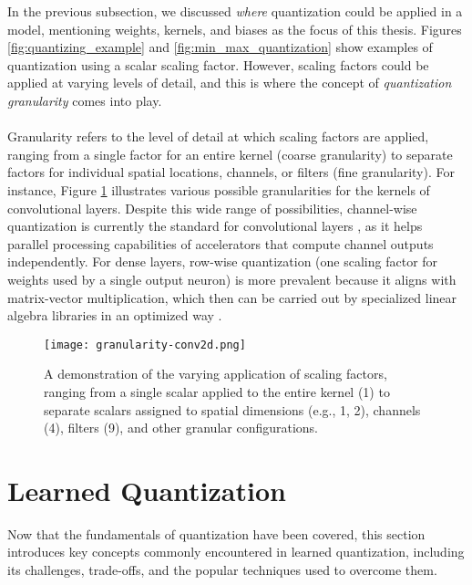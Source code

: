 \noindent In the previous subsection, we discussed \textit{where} quantization could be applied in a model, 
mentioning weights, kernels, and biases as the focus of this thesis.
Figures \ref{fig:quantizing_example} and \ref{fig:min_max_quantization} show examples of quantization
using a scalar scaling factor. However, scaling factors could be applied at varying levels of detail,
and this is where the concept of \textit{quantization granularity} comes into play.
\\
\\
Granularity refers to the level of detail at which scaling factors are applied,
ranging from a single factor for an entire kernel (coarse granularity) to separate factors for individual spatial locations,
channels, or filters (fine granularity). For instance, Figure \ref{fig:granularity-conv2d} illustrates various possible granularities
for the kernels of convolutional layers.
Despite this wide range of possibilities, channel-wise quantization is currently the standard for convolutional layers \cite{gholami2021survey},
as it helps parallel processing capabilities of accelerators that compute channel outputs independently. 
For dense layers, row-wise quantization (one scaling factor for weights used by a single output neuron) is more prevalent
because it aligns with matrix-vector multiplication, which then can be carried out by specialized linear algebra libraries
in an optimized way \cite{DBLP:journals/corr/abs-2101-05615}.

\begin{figure}[h!]
  \centering
  \texttt{[image: granularity-conv2d.png]}
  \caption{A demonstration of the varying application of scaling factors, ranging from a single scalar applied to the entire kernel (1) to separate scalars assigned to spatial dimensions (e.g., 1, 2), channels (4), filters (9), and other granular configurations.}
  \label{fig:granularity-conv2d}
\end{figure}



\section{Learned Quantization}
\label{sec:section3}
Now that the fundamentals of quantization have been covered, 
this section introduces key concepts commonly encountered in learned quantization,
including its challenges, trade-offs, and the popular techniques used to overcome them.



